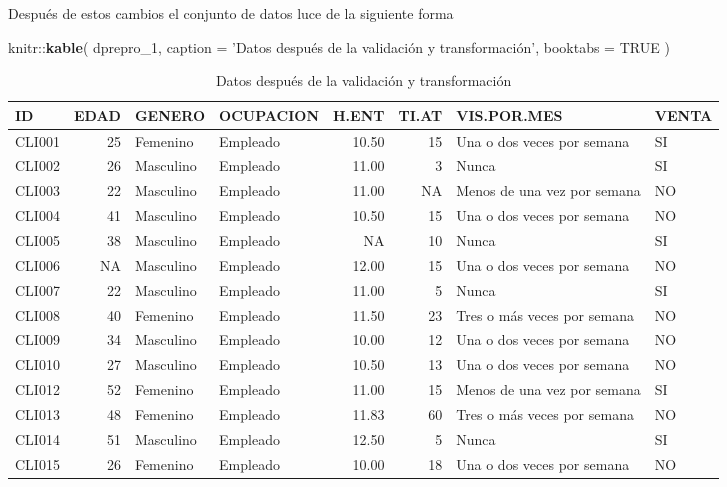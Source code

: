 \documentclass[]{book}
\newenvironment{Shaded}{\begin{snugshade}}{\end{snugshade}}
\newcommand{\KeywordTok}[1]{\textcolor[rgb]{0.13,0.29,0.53}{\textbf{{#1}}}}
\newcommand{\DataTypeTok}[1]{\textcolor[rgb]{0.13,0.29,0.53}{{#1}}}
\newcommand{\StringTok}[1]{\textcolor[rgb]{0.31,0.60,0.02}{{#1}}}
\newcommand{\OtherTok}[1]{\textcolor[rgb]{0.56,0.35,0.01}{{#1}}}
\newcommand{\NormalTok}[1]{{#1}}
\begin{document}
Después de estos cambios el conjunto de datos luce de la siguiente forma

\begin{Shaded}
\begin{Highlighting}[]
\NormalTok{knitr::}\KeywordTok{kable}\NormalTok{(}
  \NormalTok{dprepro_1, }\DataTypeTok{caption =} \StringTok{'Datos después de la validación y transformación'}\NormalTok{,}
  \DataTypeTok{booktabs =} \OtherTok{TRUE}
\NormalTok{)}
\end{Highlighting}
\end{Shaded}

\begin{table}

\caption{\label{tab:datos-despues-valitrans}Datos después de la validación y transformación}
\centering
\begin{tabular}[t]{lrllrrll}
\toprule
ID & EDAD & GENERO & OCUPACION & H.ENT & TI.AT & VIS.POR.MES & VENTA\\
\midrule
CLI001 & 25 & Femenino & Empleado & 10.50 & 15 & Una o dos veces por semana & SI\\
CLI002 & 26 & Masculino & Empleado & 11.00 & 3 & Nunca & SI\\
CLI003 & 22 & Masculino & Empleado & 11.00 & NA & Menos de una vez por semana & NO\\
CLI004 & 41 & Masculino & Empleado & 10.50 & 15 & Una o dos veces por semana & NO\\
CLI005 & 38 & Masculino & Empleado & NA & 10 & Nunca & SI\\
\addlinespace
CLI006 & NA & Masculino & Empleado & 12.00 & 15 & Una o dos veces por semana & NO\\
CLI007 & 22 & Masculino & Empleado & 11.00 & 5 & Nunca & SI\\
CLI008 & 40 & Femenino & Empleado & 11.50 & 23 & Tres o más veces por semana & NO\\
CLI009 & 34 & Masculino & Empleado & 10.00 & 12 & Una o dos veces por semana & NO\\
CLI010 & 27 & Masculino & Empleado & 10.50 & 13 & Una o dos veces por semana & NO\\
\addlinespace
CLI012 & 52 & Femenino & Empleado & 11.00 & 15 & Menos de una vez por semana & SI\\
CLI013 & 48 & Femenino & Empleado & 11.83 & 60 & Tres o más veces por semana & NO\\
CLI014 & 51 & Masculino & Empleado & 12.50 & 5 & Nunca & SI\\
CLI015 & 26 & Femenino & Empleado & 10.00 & 18 & Una o dos veces por semana & NO\\

\end{tabular}
\end{table}
\end{document}
